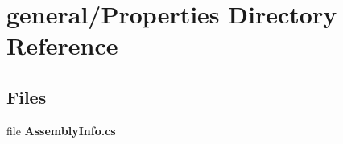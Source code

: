 \section{general/\-Properties Directory Reference}
\label{dir_35a5f66a3b7b476005d9e9c2b39558fb}
\subsection*{Files}
\begin{DoxyCompactItemize}
\item 
file {\bf Assembly\-Info.\-cs}
\end{DoxyCompactItemize}
